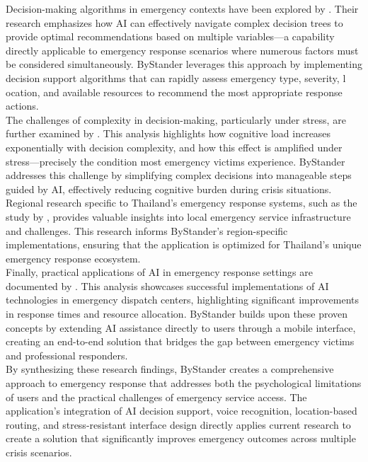 Decision-making algorithms in emergency contexts have been explored by \cite{ai_decision_making}. Their research emphasizes 
how AI can effectively navigate complex decision trees to provide optimal recommendations based on multiple variables—a capability 
directly applicable to emergency response scenarios where numerous factors must be considered simultaneously. 
ByStander leverages this approach by implementing decision support algorithms that can rapidly assess emergency type, severity, l
ocation, and available resources to recommend the most appropriate response actions. \\ 

The challenges of complexity in decision-making, particularly under stress, are further examined by \cite{complexity_decision}. 
This analysis highlights how cognitive load increases exponentially with decision complexity, and how this effect is amplified under 
stress—precisely the condition most emergency victims experience. ByStander addresses this challenge by simplifying complex decisions into manageable steps guided by AI, effectively reducing cognitive burden during crisis situations. \\

Regional research specific to Thailand's emergency response systems, such as the study by \cite{thai_ai_emergency}, provides valuable insights into local emergency service infrastructure and challenges. This research informs ByStander's region-specific implementations, ensuring that the application is optimized for Thailand's unique emergency response ecosystem. \\

Finally, practical applications of AI in emergency response settings are documented by \cite{ai_emergency_response}. This analysis showcases successful implementations of AI technologies in emergency dispatch centers, highlighting significant improvements in response times and resource allocation. ByStander builds upon these proven concepts by extending AI assistance directly to users through a mobile interface, creating an end-to-end solution that bridges the gap between emergency victims and professional responders. \\

By synthesizing these research findings, ByStander creates a comprehensive approach to emergency response that addresses both the psychological limitations of users and the practical challenges of emergency service access. The application's integration of AI decision support, voice recognition, location-based routing, and stress-resistant interface design directly applies current research to create a solution that significantly improves emergency outcomes across multiple crisis scenarios. \\
